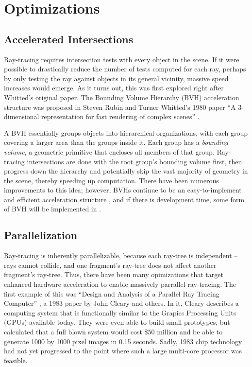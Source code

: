 \section{Optimizations}

\subsection{Accelerated Intersections}

Ray-tracing requires intersection tests with every object in the scene.
If it were possible to drastically reduce the number of tests computed for each ray, perhaps by only testing the ray against objects in its general vicinity, massive speed increases would emerge.
As it turns out, this was first explored right after Whitted's original paper.
The Bounding Volume Hierarchy (BVH) acceleration structure was proposed in Steven Rubin and Turner Whitted's 1980 paper ``A 3-dimensional representation for fast rendering of complex scenes'' \cite{rubin1980}.

A BVH essentially groups objects into hierarchical organizations, with each group covering a larger area than the groups inside it.
Each group has a {\it bounding volume}, a geometric primitive that encloses all members of that group.
Ray-tracing intersections are done with the root group's bounding volume first, then progress down the hierarchy and potentially skip the vast majority of geometry in the scene, thereby speeding up computation.
There have been numerous improvements to this idea; however, BVHs continue to be an easy-to-implement and efficient acceleration structure \cite{prunier2017bvh}, and if there is development time, some form of BVH will be implemented in \name.

\subsection{Parallelization}

Ray-tracing is inherently parallelizable, because each ray-tree is independent -- rays cannot collide, and one fragment's ray-tree does not affect another fragment's ray-tree.
Thus, there have been many opimizations that target enhanced hardware acceleration to enable massively parrallel ray-tracing.
The first example of this was ``Design and Analysis of a Parallel Ray Tracing Computer'' \cite{cleary1983design}, a 1983 paper by John Cleary and others.
In it, Cleary describes a computing system that is functionally similar to the Grapics Processing Units (GPUs) available today.
They were even able to build small prototypes, but calculated that a full blown system would cost \$50 million and be able to generate 1000 by 1000 pixel images in 0.15 seconds.
Sadly, 1983 chip technology had not yet progressed to the point where such a large multi-core processor was feasible.

